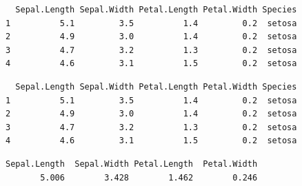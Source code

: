 \documentclass[
  11pt,
]{krantz}
\newenvironment{Shaded}{\begin{snugshade}}{\end{snugshade}}
\newcommand{\CommentTok}[1]{\textcolor[rgb]{0.37,0.37,0.37}{\textit{#1}}}
\newcommand{\DecValTok}[1]{\textcolor[rgb]{0.06,0.06,0.06}{#1}}
\newcommand{\KeywordTok}[1]{\textcolor[rgb]{0.27,0.27,0.27}{\textbf{#1}}}
\newcommand{\NormalTok}[1]{#1}
\newcommand{\OperatorTok}[1]{\textcolor[rgb]{0.43,0.43,0.43}{\textbf{#1}}}
\newcommand{\StringTok}[1]{\textcolor[rgb]{0.5,0.5,0.5}{#1}}
\begin{document}
\begin{verbatim}
  Sepal.Length Sepal.Width Petal.Length Petal.Width Species
1          5.1         3.5          1.4         0.2  setosa
2          4.9         3.0          1.4         0.2  setosa
3          4.7         3.2          1.3         0.2  setosa
4          4.6         3.1          1.5         0.2  setosa
\end{verbatim}

\begin{Shaded}
\end{Shaded}

\begin{verbatim}
  Sepal.Length Sepal.Width Petal.Length Petal.Width Species
1          5.1         3.5          1.4         0.2  setosa
2          4.9         3.0          1.4         0.2  setosa
3          4.7         3.2          1.3         0.2  setosa
4          4.6         3.1          1.5         0.2  setosa
\end{verbatim}

\begin{Shaded}
\end{Shaded}

\begin{verbatim}
Sepal.Length  Sepal.Width Petal.Length  Petal.Width 
       5.006        3.428        1.462        0.246 
\end{verbatim}

\begin{Shaded}
\end{Shaded}
\end{document}
